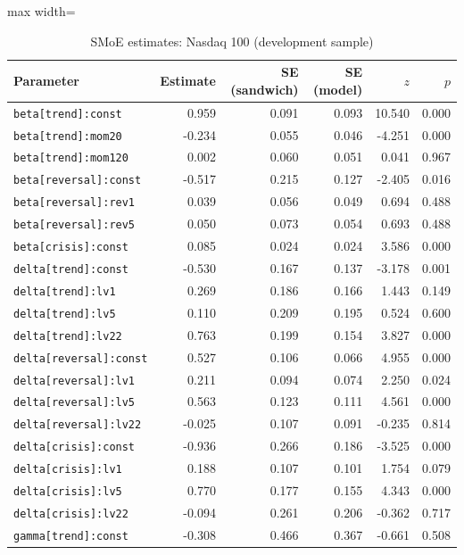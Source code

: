 \begin{table}[!htbp]\centering\scriptsize
\caption{SMoE estimates: Nasdaq 100 (development sample)}\label{tab:params_ndx}
\begin{adjustbox}{max width=\textwidth}
\begin{tabular}{lrrrrr}
\toprule
Parameter & Estimate & SE (sandwich) & SE (model) & $z$ & $p$\\
\midrule
\texttt{beta[trend]:const} & 0.959 & 0.091 & 0.093 & 10.540 & 0.000\\
\texttt{beta[trend]:mom20} & -0.234 & 0.055 & 0.046 & -4.251 & 0.000\\
\texttt{beta[trend]:mom120} & 0.002 & 0.060 & 0.051 & 0.041 & 0.967\\
\texttt{beta[reversal]:const} & -0.517 & 0.215 & 0.127 & -2.405 & 0.016\\
\texttt{beta[reversal]:rev1} & 0.039 & 0.056 & 0.049 & 0.694 & 0.488\\
\texttt{beta[reversal]:rev5} & 0.050 & 0.073 & 0.054 & 0.693 & 0.488\\
\texttt{beta[crisis]:const} & 0.085 & 0.024 & 0.024 & 3.586 & 0.000\\
\texttt{delta[trend]:const} & -0.530 & 0.167 & 0.137 & -3.178 & 0.001\\
\texttt{delta[trend]:lv1} & 0.269 & 0.186 & 0.166 & 1.443 & 0.149\\
\texttt{delta[trend]:lv5} & 0.110 & 0.209 & 0.195 & 0.524 & 0.600\\
\texttt{delta[trend]:lv22} & 0.763 & 0.199 & 0.154 & 3.827 & 0.000\\
\texttt{delta[reversal]:const} & 0.527 & 0.106 & 0.066 & 4.955 & 0.000\\
\texttt{delta[reversal]:lv1} & 0.211 & 0.094 & 0.074 & 2.250 & 0.024\\
\texttt{delta[reversal]:lv5} & 0.563 & 0.123 & 0.111 & 4.561 & 0.000\\
\texttt{delta[reversal]:lv22} & -0.025 & 0.107 & 0.091 & -0.235 & 0.814\\
\texttt{delta[crisis]:const} & -0.936 & 0.266 & 0.186 & -3.525 & 0.000\\
\texttt{delta[crisis]:lv1} & 0.188 & 0.107 & 0.101 & 1.754 & 0.079\\
\texttt{delta[crisis]:lv5} & 0.770 & 0.177 & 0.155 & 4.343 & 0.000\\
\texttt{delta[crisis]:lv22} & -0.094 & 0.261 & 0.206 & -0.362 & 0.717\\
\texttt{gamma[trend]:const} & -0.308 & 0.466 & 0.367 & -0.661 & 0.508\\

\end{tabular}
\end{adjustbox}
\end{table}

